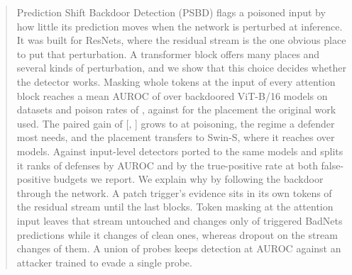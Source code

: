 \begin{abstract}
Prediction Shift Backdoor Detection (PSBD) flags a poisoned input by how little its
prediction moves when the network is perturbed at inference. It was built for ResNets,
where the residual stream is the one obvious place to put that perturbation. A
transformer block offers many places and several kinds of perturbation, and we show that
this choice decides whether the detector works. Masking whole tokens at the input of
every attention block reaches a mean AUROC of \HeadlineAurocAdaptive{} over
\PanelCellsCached{} backdoored ViT-B/16 models on \PanelDatasetsCached{} datasets and
poison rates of \PanelRates{}, against \PublishedAurocAdaptive{} for the placement the
original work used. The paired gain of \HeadlineGainAdaptiveAuroc{}
[\HeadlineGainAdaptiveAurocLow{}, \HeadlineGainAdaptiveAurocHigh{}] grows to
\GainsLowestRate{} at \PanelRateLow{} poisoning, the regime a defender most needs, and
the placement transfers to Swin-S, where it reaches \SwinRecommendedAurocAdaptive{} over
\SwinCells{} models. Against \DetectorsComparedCount{} input-level detectors ported to
the same models and splits it ranks \DetectorsAurocRankOurs{} of \DetectorsAurocDefensesRanked{} defenses
by AUROC and by the true-positive rate at both false-positive budgets we report. We
explain why by following the backdoor through the network. A patch trigger's evidence
sits in its own tokens of the residual stream until the last blocks. Token masking at the
attention input leaves that stream untouched and changes only
\SurvivalTmBadnetATwooTriggered{} of triggered BadNets predictions while it changes
\SurvivalTmClean{} of clean ones, whereas dropout on the stream changes
\SurvivalRdBadnetATwooTriggered{} of them. A
union of probes keeps detection at \AdaptiveVitUnion{} AUROC against an attacker trained
to evade a single probe.
\end{abstract}
